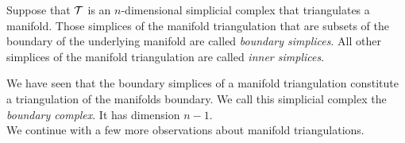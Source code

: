 \documentclass[a4paper]{article}
\begin{document}
Suppose that ${\mathcal T}$ is an $n$-dimensional simplicial complex that triangulates a manifold. 
Those simplices of the manifold triangulation that are subsets of the boundary of the underlying manifold are called \emph{boundary simplices}. 
All other simplices of the manifold triangulation are called \emph{inner simplices}. 

We have seen that the boundary simplices of a manifold triangulation constitute a triangulation of the manifolds boundary. 
We call this simplicial complex the \emph{boundary complex}. It has dimension $n-1$. 
\\

We continue with a few more observations about manifold triangulations.
\end{document}
